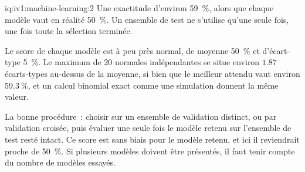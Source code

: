 \begin{solution}{iq:iv1:machine-learning:2}
Une exactitude d'environ 59~\%, alors que chaque modèle vaut en réalité 50~\%. Un ensemble de test ne s'utilise qu'une seule fois, une fois toute la sélection terminée.

Le score de chaque modèle est à peu près normal, de moyenne 50~\% et d'écart-type 5~\%. Le maximum de 20 normales indépendantes se situe environ $1.87$ écarts-types au-dessus de la moyenne, si bien que le meilleur attendu vaut environ $59.3~\%$, et un calcul binomial exact comme une simulation donnent la même valeur.

La bonne procédure~: choisir sur un ensemble de validation distinct, ou par validation croisée, puis évaluer une seule fois le modèle retenu sur l'ensemble de test resté intact. Ce score est sans biais pour le modèle retenu, et ici il reviendrait proche de 50~\%. Si plusieurs modèles doivent être présentés, il faut tenir compte du nombre de modèles essayés.



\end{solution}

